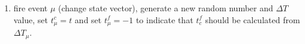 \documentclass[a4paper,11pt]{article}
\begin{document}
\begin{itemize}
\begin{enumerate}
				\item fire event $\mu$ (change state vector), generate a new random number and $\Delta T$ value, set
					$t^c_\mu = t$ and set $t^f_\mu = -1$ to indicate that $t^f_c$ should be calculated from
					$\Delta T_\mu$.

			\end{enumerate}
		\end{itemize}
\end{document}
